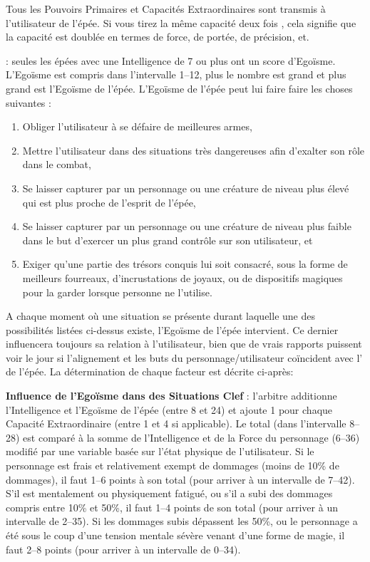 {\medskip

Tous les Pouvoirs Primaires et Capacités Extraordinaires sont transmis à l'utilisateur de l'épée. Si vous tirez la même capacité deux fois , cela signifie que la capacité est doublée en termes de force, de portée, de précision, et.

\bigskip

 : seules les épées avec une Intelligence de 7 ou plus ont un score d'Egoïsme. L'Egoïsme est compris dans l'intervalle 1--12, plus le nombre est grand et plus grand est l'Egoïsme de l'épée. L'Egoïsme de l'épée peut lui faire faire les choses suivantes :

\begin{enumerate}
\item Obliger l'utilisateur à se défaire de meilleures armes,
\item Mettre l'utilisateur dans des situations très dangereuses afin d'exalter son rôle dans le combat,
\item Se laisser capturer par un personnage ou une créature de niveau plus élevé qui est plus proche de l'esprit de l'épée,
\item Se laisser capturer par un personnage ou une créature de niveau plus faible dans le but d'exercer un plus grand contrôle sur son utilisateur, et
\item Exiger qu'une partie des trésors conquis lui soit consacré, sous la forme de meilleurs fourreaux, d'incrustations de joyaux, ou de dispositifs magiques pour la garder lorsque personne ne l'utilise.
\end{enumerate}

A chaque moment où une situation se présente durant laquelle une des possibilités listées ci-dessus existe, l'Egoïsme de l'épée intervient. Ce dernier influencera toujours sa relation à l'utilisateur, bien que de vrais rapports puissent voir le jour si l'alignement et les buts du personnage/utilisateur coïncident avec l' de l'épée. La détermination de chaque facteur est décrite ci-après:

\begin{center}
\begin{minipage}{0.8\linewidth}
\textbf{Influence de l'Egoïsme dans des Situations Clef} : l'arbitre additionne l'Intelligence et l'Egoïsme de l'épée (entre 8 et 24) et ajoute 1 pour chaque Capacité Extraordinaire (entre 1 et 4 si applicable). Le total (dans l'intervalle 8--28) est comparé à la somme de l'Intelligence et de la Force du personnage (6--36) modifié par une variable basée sur l'état physique de l'utilisateur. Si le personnage est frais et relativement exempt de dommages (moins de 10\% de dommages), il faut  1--6 points à son total (pour arriver à un intervalle de 7--42). S'il est mentalement ou physiquement fatigué, ou s'il a subi des dommages compris entre 10\% et 50\%, il faut  1--4 points de son total (pour arriver à un intervalle de 2--35). Si les dommages subis dépassent les 50\%, ou le personnage a été sous le coup d'une tension mentale sévère venant d'une forme de magie, il faut  2--8 points (pour arriver à un intervalle de 0--34).


\end{minipage}
\end{center}}
